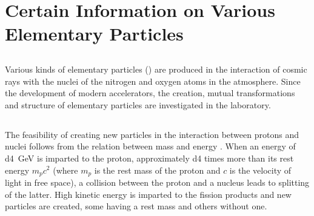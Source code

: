 \section{Certain Information on Various Elementary Particles}
\label{sec-43.3} 


\subsection{}\label{43.3.1} Various kinds of elementary particles () are produced in the interaction of cosmic rays with the nuclei of the nitrogen and oxygen atoms in the atmosphere. Since the development of modern accelerators, the creation, mutual transformations and structure of elementary particles are investigated in the laboratory.

\subsection{}\label{43.3.2} The feasibility of creating new particles in the interaction between protons and nuclei follows from the relation between mass and energy . When an energy of \SI{d4}{\GeV} is imparted
to the proton, approximately \num{d4} times more than its rest energy $m_{p}c^{2}$ (where $m_{p}$ is the rest mass of the proton and $c$ is the velocity of light in free space), a collision between the proton and a nucleus leads to splitting of the latter. High kinetic energy is imparted to the fission products and new particles are created, some having a rest mass and others without one.

